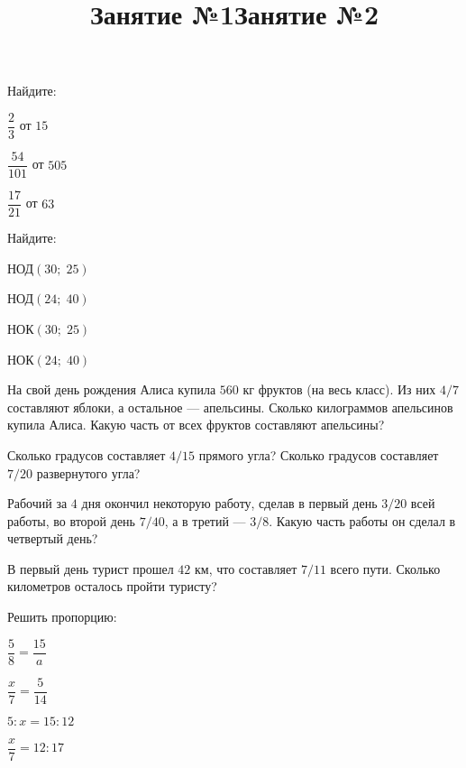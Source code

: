\title{Занятие №1}
\begin{listofex}
	\item Найдите:
	\begin{enumcols}[itemcolumns=3]
		\item \( \dfrac{2}{3} \) от \( 15 \)
		\item \( \dfrac{54}{101} \) от \( 505 \)
		\item \( \dfrac{17}{21} \) от \( 63 \)
	\end{enumcols}
	\item Найдите:
	\begin{enumcols}[itemcolumns=4]
		\item НОД\( (30;\;25) \)
		\item НОД\( (24;\;40) \)
		\item НОК\( (30;\;25) \)
		\item НОК\( (24;\;40) \)
	\end{enumcols}
	\item На свой день рождения Алиса купила \( 560 \) кг фруктов (на весь класс). Из них \( 4/7 \) составляют яблоки, а остальное --- апельсины. Сколько килограммов апельсинов купила Алиса. Какую часть от всех фруктов составляют апельсины?
	\item Сколько градусов составляет \( 4/15 \) прямого угла? Сколько градусов составляет \( 7/20 \) развернутого угла?
	\item Рабочий за \( 4 \) дня окончил некоторую работу, сделав в первый день \( 3/20 \) всей работы, во второй день \( 7/40 \), а в третий --- \( 3/8 \). Какую часть работы он сделал в четвертый день?
	\item В первый день турист прошел \( 42 \) км, что составляет \( 7/11 \) всего пути. Сколько километров осталось пройти туристу?
	\item Решить пропорцию:
	\begin{enumcols}[itemcolumns=4]
		\item \( \dfrac{5}{8}=\dfrac{15}{a} \)
		\item \( \dfrac{x}{7}=\dfrac{5}{14} \)
		\item \( 5:x=15:12 \)
		\item \( \dfrac{x}{7}=12:17 \)
	\end{enumcols}
\end{listofex}
\newpage
\title{Занятие №2}
